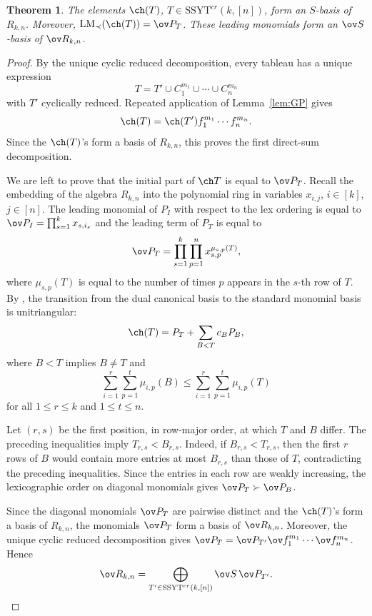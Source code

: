 \documentclass[11pt]{amsart}
\numberwithin{equation}{section}
\newtheorem{thm}{Theorem}[section]
\newcommand{\SSYT}{\mathrm{SSYT}}
\begin{document}
\begin{thm}
\label{thm:cyclic-ch-and-diagonal-bases}
The elements $\ch(T)$, $T\in\SSYT^{cr}(k,[n])$,
form an $S$-basis of $R_{k,n}$.
Moreover,
$\operatorname{LM}_{\prec}(\ch(T))=\ov P_T$.
These leading monomials form an $\ov S$-basis of
$\ov R_{k,n}$.
\end{thm}

\begin{proof}
By the unique cyclic reduced decomposition, every tableau has a unique
expression
\[
T=T'\cup C_1^{m_1}\cup\cdots\cup C_n^{m_n}
\]
with $T'$ cyclically reduced.  Repeated application of
Lemma~\ref{lem:GP} gives
\[
\ch(T)
=
\ch(T')f_1^{m_1}\cdots f_n^{m_n}.
\]
Since the $\ch(T)$'s form a basis of $R_{k,n}$, this proves the
first direct-sum decomposition.  

We are left to prove that the initial part of $\ch T$ is equal to $\ov P_T$.
Recall the embedding of the algebra $R_{k,n}$ into the polynomial
ring in variables $x_{i,j}$, $i\in [k]$, $j\in [n]$. 
The leading monomial of $P_I$ 
with respect to the lex ordering
is equal to $\ov P_I = \prod_{s=1}^k x_{s,i_s}$ and the leading term of $P_T$ is equal to
\[
\ov P_T = \prod_{s=1}^k\prod_{p=1}^n x_{s,p}^{\mu_{s,p}(T)},
\]
where $\mu_{s,p}(T)$ is equal to the number of times $p$ appears in the
$s$-th row of $T$.
By \cite{Br06}, the transition from the dual
canonical basis to the standard monomial basis
is unitriangular:
\[
\ch(T)=P_T+\sum_{B<T}c_BP_B,
\]
where $B<T$ implies $B\neq T$ and
\[
\sum_{i=1}^r\sum_{p=1}^t\mu_{i,p}(B)
\le
\sum_{i=1}^r\sum_{p=1}^t\mu_{i,p}(T)
\]
for all $1\le r\le k$ and $1\le t\le n$.


Let $(r,s)$ be the first position, in
row-major order, at which $T$ and $B$
differ. 
The preceding inequalities imply
$T_{r,s}<B_{r,s}$.
Indeed, if $B_{r,s}<T_{r,s}$, then the first
$r$ rows of $B$ would contain more entries
at most $B_{r,s}$ than those of $T$,
contradicting the preceding inequalities.
Since the entries in each row are weakly
increasing, the lexicographic order on
diagonal monomials gives
$\ov P_T\succ\ov P_B$.

Since the diagonal monomials $\ov P_T$ are
pairwise distinct and the $\ch(T)$'s form
a basis of $R_{k,n}$, the monomials
$\ov P_T$ form a basis of $\ov R_{k,n}$.
Moreover, the unique cyclic reduced decomposition
gives
$\ov P_T
=
\ov P_{T'}\ov f_1^{m_1}\cdots\ov f_n^{m_n}$.
Hence
\[
\ov R_{k,n}
=
\bigoplus_{T'\in\SSYT^{cr}(k,[n])}
\ov S\,\ov P_{T'}.
\]
\end{proof}
\end{document}
